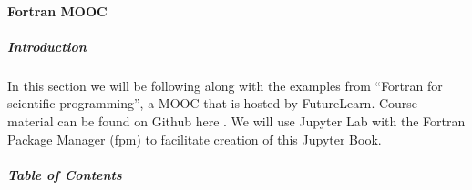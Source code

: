 \paragraph{Fortran MOOC}

\subparagraph{Introduction}

In this section we will be following along with the examples from ``Fortran for scientific programming'', a MOOC that is hosted by FutureLearn. Course material can be found on Github here . We will use Jupyter Lab with the Fortran Package Manager (fpm) to facilitate creation of this Jupyter Book.

\subparagraph{Table of Contents}